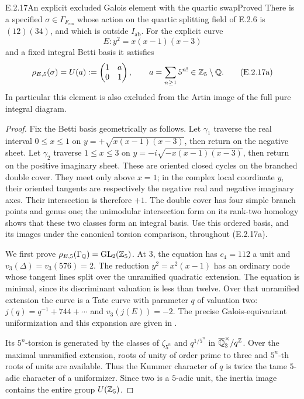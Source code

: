 \begin{result}{E.2.17}{An explicit excluded Galois element with the quartic swap}{Proved}
There is a specified \(\sigma\in\Gamma_{F_{\mathrm{cm}}}\)
whose action on the quartic splitting field of E.2.6 is
\((12)(34)\), and which is outside \(I_{\mathrm{ab}}\).
For the explicit curve
\[
 E:y^2=x(x-1)(x-3)
\]
and a fixed integral Betti basis it satisfies
\[
 \rho_{E,5}(\sigma)=
 U(a):=\begin{pmatrix}1&a\\0&1\end{pmatrix},
 \qquad a=\sum_{n\ge1}5^{n!}\in\mathbb Z_5\setminus\mathbb Q .
 \tag{E.2.17a}
\]
In particular this element is also excluded from the Artin
image of the full pure integral diagram.
\end{result}
\begin{proof}
Fix the Betti basis geometrically as follows. Let \(\gamma_1\)
traverse the real interval \(0\le x\le1\) on
\(y=+\sqrt{x(x-1)(x-3)}\), then return on the negative
sheet. Let \(\gamma_2\) traverse \(1\le x\le3\) on
\(y=-i\sqrt{-x(x-1)(x-3)}\), then return on the positive
imaginary sheet. These are oriented closed cycles on the
branched double cover. They meet only above \(x=1\); in
the complex local coordinate \(y\), their oriented tangents
are respectively the negative real and negative imaginary
axes. Their intersection is therefore \(+1\).
The double cover has four simple branch points and genus
one; the unimodular intersection form on its rank-two
homology shows that these two classes form an integral
basis. Use this ordered basis, and its images under the
canonical torsion comparison, throughout (E.2.17a).

We first prove
\(\rho_{E,5}(\Gamma_{\mathbb Q})=\operatorname{GL}_2(\mathbb Z_5)\).
At \(3\), the equation has \(c_4=112\) a unit and
\(v_3(\Delta)=v_3(576)=2\).
The reduction \(y^2=x^2(x-1)\) has an ordinary node whose
tangent lines split over the unramified quadratic extension.
The equation is minimal, since its discriminant valuation is
less than twelve. Over that unramified extension the curve
is a Tate curve with parameter \(q\) of valuation two:
\(j(q)=q^{-1}+744+\cdots\) and \(v_3(j(E))=-2\).
The precise Galois-equivariant uniformization and this
expansion are given in \cite[Section19, p.44]{GenConradTate}.

Its \(5^n\)-torsion is generated by the classes of
\(\zeta_{5^n}\) and \(q^{1/5^n}\) in
\(\overline{\mathbb Q}_3^\times/q^\mathbb Z\).
Over the maximal unramified extension, roots of unity of
order prime to three and \(5^n\)-th roots of units are
available. Thus the Kummer character of \(q\) is twice
the tame \(5\)-adic character of a uniformizer.
Since two is a \(5\)-adic unit, the inertia image contains
the entire group \(U(\mathbb Z_5)\).


\end{proof}
